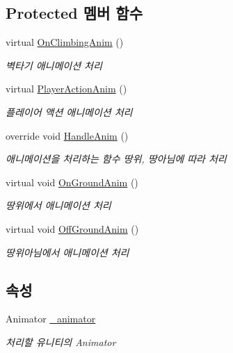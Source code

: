 \subsection*{Protected 멤버 함수}
\begin{DoxyCompactItemize}
\item 
virtual \mbox{\hyperlink{class_player_state_a2260a17e1f15130a40085be802737b0a}{On\+Climbing\+Anim}} ()
\begin{DoxyCompactList}\small\item\em 벽타기 애니메이션 처리 \end{DoxyCompactList}\item 
virtual \mbox{\hyperlink{class_player_state_a573debbcf99d98c57f82398924dc9924}{Player\+Action\+Anim}} ()
\begin{DoxyCompactList}\small\item\em 플레이어 액션 애니메이션 처리 \end{DoxyCompactList}\item 
override void \mbox{\hyperlink{class_player_state_ae57c0c11c946d701bb1e0eb2bc7204dd}{Handle\+Anim}} ()
\begin{DoxyCompactList}\small\item\em 애니메이션을 처리하는 함수\textquotesingle{} 땅위, 땅아님에 따라 처리 \end{DoxyCompactList}\item 
virtual void \mbox{\hyperlink{class_state_adc5e7be4e977f0a64b29b01171eda8af}{On\+Ground\+Anim}} ()
\begin{DoxyCompactList}\small\item\em 땅위에서 애니메이션 처리 \end{DoxyCompactList}\item 
virtual void \mbox{\hyperlink{class_state_a2909a234430fa7752fadf2bb993ab5e2}{Off\+Ground\+Anim}} ()
\begin{DoxyCompactList}\small\item\em 땅위아님에서 애니메이션 처리 \end{DoxyCompactList}\end{DoxyCompactItemize}
\subsection*{속성}
\begin{DoxyCompactItemize}
\item 
Animator \mbox{\hyperlink{class_state_aff1dd03a1b3c63053b23371d6d70cd1a}{\+\_\+animator}}
\begin{DoxyCompactList}\small\item\em 처리할 유니티의 Animator \end{DoxyCompactList}\end{DoxyCompactItemize}
